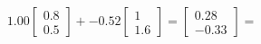 \documentclass[preview]{standalone}
\begin{document}
\begin{align*}
1.00 \begin{bmatrix} 0.8 \\ 0.5 \end{bmatrix} + -0.52 \begin{bmatrix} 1 \\ 1.6 \end{bmatrix} = \begin{bmatrix} 0.28 \\ -0.33 \end{bmatrix} =
\end{align*}
\end{document}
